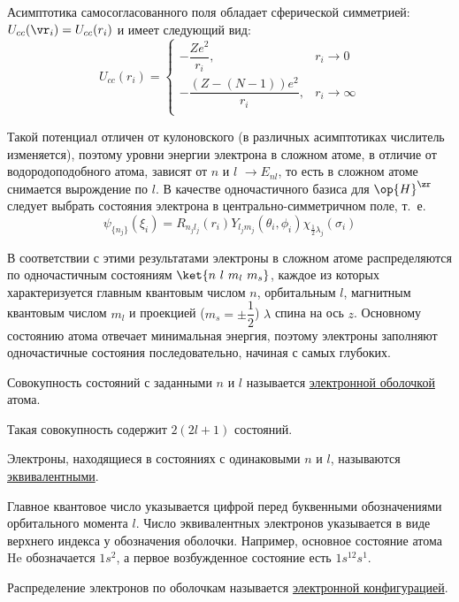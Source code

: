 Асимптотика самосогласованного поля обладает сферической симметрией: $U_{cc}(\vr_i) = U_{cc}(r_i)$ и имеет следующий вид:
$$
U_{cc}(r_i) =
\begin{cases}
-\dfrac{Ze^2}{r_i},& r_i \to 0\\
-\dfrac{(Z-(N-1))e^2}{r_i},& r_i \to \infty\\
\end{cases}
$$

Такой потенциал отличен от кулоновского (в различных асимптотиках числитель изменяется), поэтому уровни энергии электрона в сложном атоме, в отличие от водородоподобного атома, зависят от $n$ и $l$ $\to E_{nl}$, то есть в сложном атоме снимается вырождение по $l$. В качестве одночастичного базиса для $\op{H}^\zr$ следует выбрать состояния электрона в центрально-симметричном поле, т.~е.
$$
\psi_{\{n_j\}}(\xi_i) = R_{n_j l_j}(r_i) Y_{l_j m_j}(\theta_i, \phi_i) \chi_{\frac{1}{2} \lambda_j}(\sigma_i)
$$

В соответствии с этими результатами электроны в сложном атоме распределяются по одночастичным состояниям $\ket{n~l~m_l~m_s}$, каждое из которых характеризуется главным квантовым числом $n$, орбитальным $l$, магнитным квантовым числом $m_l$ и проекцией ($m_s = \pm \dfrac{1}{2}$) $\lambda$ спина на ось $z$. Основному состоянию атома отвечает минимальная энергия, поэтому электроны заполняют одночастичные состояния последовательно, начиная с самых глубоких.

\begin{defn}
Совокупность состояний с заданными $n$ и $l$ называется \underline{электронной оболочкой} атома.
\end{defn}
Такая совокупность содержит $2(2l + 1)$ состояний.

\begin{defn}
Электроны, находящиеся в состояниях с одинаковыми $n$ и $l$, называются \underline{эквивалентными}.
\end{defn}

Главное квантовое число указывается цифрой перед буквенными обозначениями орбитального момента $l$. Число эквивалентных электронов указывается в виде верхнего индекса у обозначения оболочки. Например, основное состояние атома He обозначается $1s^2$, а первое возбужденное состояние есть $1s^12s^1$.

\begin{defn}
Распределение электронов по оболочкам называется \underline{электронной конфигурацией}. 
\end{defn}

